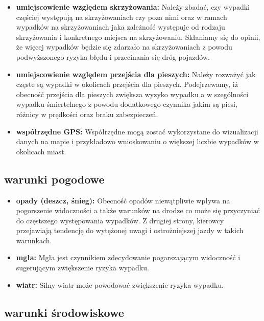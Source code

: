 \begin{itemize}
\itemsep1pt\parskip0pt
\item
  \textbf{umiejscowienie względem skrzyżowania:} Należy zbadać, czy
  wypadki częściej występują na skrzyżowaniach czy poza nimi oraz w
  ramach wypadków na skrzyżowaniach jaka zależność występuje od rodzaju
  skrzyżowania i konkretnego miejsca na skrzyżowaniu. Skłaniamy się do
  opinii, że więcej wypadków będzie się zdarzało na skrzyżowaniach z
  powodu podwyższonego ryzyka błędu i przecinania się dróg pojazdów.\\
\item
  \textbf{umiejscowienie względem przejścia dla pieszych:} Należy
  rozważyć jak częste są wypadki w okolicach przejścia dla pieszych.
  Podejrzewamy, iż obecność przejścia dla pieszych zwiększa wyzyko
  wypadku a w szególności wypadku śmiertelnego z powodu dodatkowego
  czynnika jakim są piesi, różnicy w prędkości oraz braku
  zabezpieczeń.\\
\item
  \textbf{współrzędne GPS:} Współrzędne mogą zostać wykorzystane do
  wizualizacji danych na mapie i przykładowo wnioskowaniu o większej
  liczbie wypadków w okolicach miast.
\end{itemize}

\subsection{warunki pogodowe}\label{warunki-pogodowe}

\begin{itemize}
\itemsep1pt\parskip0pt
\item
  \textbf{opady (deszcz, śnieg):} Obecność opadów niewątpliwie wpływa na
  pogorszenie widoczności a także warunków na drodze co może się
  przyczyniać do częstszego występowania wypadków. Z drugiej strony,
  kierowcy przejawiają tendencję do wytężonej uwagi i ostrożniejszej
  jazdy w takich warunkach.\\
\item
  \textbf{mgła:} Mgła jest czynnikiem zdecydowanie pogarszającym
  widoczność i sugerującym zwiększenie ryzyka wypadku.\\
\item
  \textbf{wiatr:} Silny wiatr może powodować zwiększenie ryzyka wypadku.
\end{itemize}

\subsection{warunki środowiskowe}\label{warunki-srodowiskowe}

